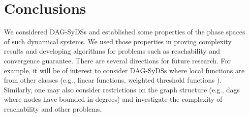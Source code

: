 \section{Conclusions}
\label{sec:concl}
 
We considered DAG-SyDSs 
and established some properties of the phase spaces of
such dynamical systems. We used those properties in proving
complexity results and developing algorithms 
for problems such as reachability and convergence guarantee.
There are several directions for future research.
For example, it will be of interest to consider 
DAG-SyDSs where local functions are from other classes
(e.g., linear functions, weighted threshold functions \cite{Crama-Hammer-2011}).
Similarly, one may also consider restrictions
on the graph structure (e.g., dags where nodes have
bounded in-degrees) and investigate 
the complexity of reachability and other problems.


\iffalse
\noindent
\paragraph{Conclusions.}


\paragraph{Open Questions.}

\begin{itemize}
\item For DAG linear SyDSs, how long can a phase space cycle and transient be,
as a function of depth.

\item For bounded degree DAG  SyDSs, how long can a phase space cycle and transient be,
as a function of depth.

\item For various classes of Boolean functions of interest, 
how long can a phase space cycle and transient be?
(If they are polynomially bounded as a function of the number of nodes,
then reachability is polynomially solvable.)
\end{itemize}
\fi
